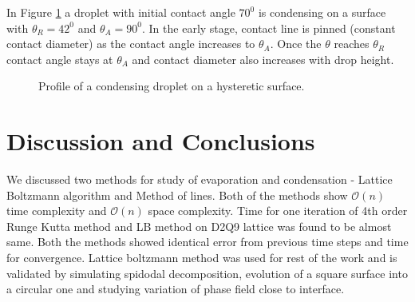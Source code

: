 \documentclass{article}
\begin{document}
\par
In Figure \ref*{fig:condn_cah} a droplet with initial contact angle $70^{0}$ is condensing on a surface with $\theta_{R} = 42^{0}$ and $\theta_{A} = 90^{0}$. In the early stage, contact line is pinned (constant contact diameter) as the contact angle increases to $\theta_{A}$. Once the $\theta$ reaches $\theta_{R}$ contact angle stays at $\theta_{A}$ and contact diameter also increases with drop height. 
\begin{figure}[h!]
	\begin{center}
		\caption{Profile of a condensing droplet on a hysteretic surface. }
		\label{fig:condn_cah}
	\end{center}
	
\end{figure}

\section{Discussion and Conclusions}

\par
We discussed two methods for study of evaporation and condensation - Lattice Boltzmann algorithm and Method of lines. Both of the methods show $\mathcal{O}(n)$ time complexity and $\mathcal{O}(n)$ space complexity. Time for one iteration of 4th order Runge Kutta method and LB method on D2Q9 lattice was found to be almost same. Both the methods showed identical error from previous time steps and time for convergence. Lattice boltzmann method was used for rest of the work and is validated by simulating spidodal decomposition, evolution of a square surface into a circular one and studying variation of phase field close to interface. 
\end{document}
